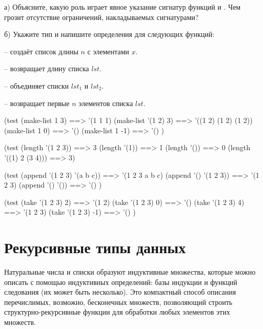 \begin{Assignment}
а) Объясните, какую роль играет явное указание сигнатур функций  и . Чем грозит отсутствие ограничений, накладываемых сигнатурами?

\medskip
б) Укажите тип и напишите определения для следующих функций:

 -- создаёт список длины $n$ с элементами $x$.

 -- возвращает длину списка $lst$.

 -- объединяет списки $lst_1$ и $lst_2$.

 -- возвращает первые $n$ элементов списка $lst$.

\begin{Specification}
(test 
  (make-list 1 3)      ==> '(1 1 1)
  (make-list '(1 2) 3) ==> '((1 2) (1 2) (1 2))
  (make-list 1 0)      ==> '()
  (make-list 1 -1)     ==> '() )
\end{Specification}

\begin{Specification}
(test 
  (length '(1 2 3))       ==>  3
  (length '(1))           ==> 1
  (length '())            ==> 0
  (length '((1) 2 (3 4))) ==> 3)
\end{Specification}

\begin{Specification}
(test 
  (append '(1 2 3) '(a b c)) ==>  '(1 2 3 a b c)
  (append '() '(1 2 3))      ==>  '(1 2 3)
  (append '() '())           ==>  '() )
\end{Specification}

\begin{Specification}
(test 
  (take '(1 2 3) 2)    ==>  '(1 2)
  (take '(1 2 3) 0)    ==>  '()
  (take '(1 2 3) 4)    ==>  '(1 2 3)
  (take '(1 2 3) -1)   ==>  '() )
\end{Specification}
\end{Assignment}

\section{Рекурсивные типы данных}%
Натуральные числа и списки образуют индуктивные множества, которые можно описать с помощью индуктивных определений: базы индукции и функций следования (их может быть несколько). Это компактный способ описания перечислимых, возможно, бесконечных множеств, позволяющий строить структурно-рекурсивные функции для обработки любых элементов этих множеств.

